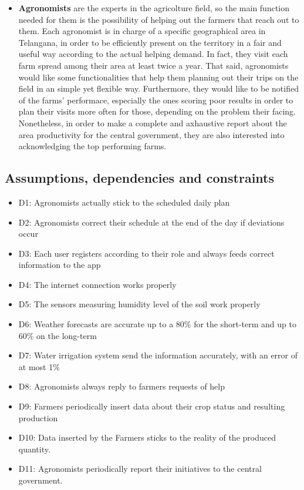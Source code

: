 \documentclass[table, 12pt]{article}
\begin{document}
\begin{itemize}
    \item \textbf{Agronomists} are the experts in the agricolture field, so the main function needed for them is the possibility of helping out the farmers that reach out to them. Each agronomist is in charge of a specific geographical area in Telangana, in order to be efficiently present on the territory in a fair and useful way according to the actual helping demand. In fact, they visit each farm spread among their area at least twice a year. That said, agronomists would like some functionalities that help them planning out their trips on the field in an simple yet flexible way. Furthermore, they would like to be notified of the farms' performace, especially the ones scoring poor results in order to plan their visits more often for those, depending on the problem their facing. Nonetheless, in order to make a complete and axhaustive report about the area productivity for the central government, they are also interested into acknowledging the top performing farms. %
\end{itemize}
\subsection{Assumptions, dependencies and constraints}
\begin{itemize}
    \item D1: Agronomists actually stick to the scheduled daily plan
    \item D2: Agronomists correct their schedule at the end of the day if deviations occur
    \item D3: Each user registers according to their role and always feeds correct information to the app
    \item D4: The internet connection works properly
    \item D5: The sensors measuring humidity level of the soil work properly
    \item D6: Weather forecasts are accurate up to a 80\% for the short-term and up to 60\% on the long-term
    \item D7: Water irrigation system send the information accurately, with an error of at most 1\%
    \item D8: Agronomists always reply to farmers requests of help
    \item D9: Farmers periodically insert data about their crop status and resulting production
    \item D10: Data inserted by the Farmers sticks to the reality of the produced quantity.
    \item D11: Agronomists periodically report their initiatives to the central government.
\end{itemize}
\end{document}
